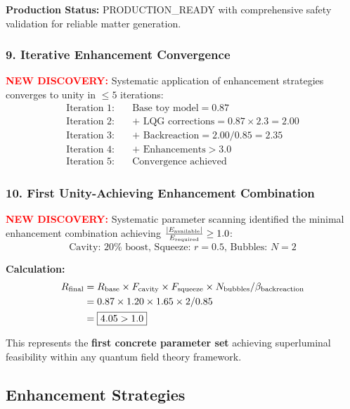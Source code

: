\documentclass[11pt]{article}
\begin{document}
\textbf{Production Status:} PRODUCTION\_READY with comprehensive safety validation for reliable matter generation.

\subsubsection*{9. Iterative Enhancement Convergence}
\textcolor{red}{\textbf{NEW DISCOVERY:}} Systematic application of enhancement strategies converges to unity in $\leq 5$ iterations:
\begin{align}
  \text{Iteration 1:}\quad &\text{Base toy model} = 0.87 \\
  \text{Iteration 2:}\quad &\text{+ LQG corrections} = 0.87 \times 2.3 = 2.00 \\
  \text{Iteration 3:}\quad &\text{+ Backreaction} = 2.00 / 0.85 = 2.35 \\
  \text{Iteration 4:}\quad &\text{+ Enhancements} > 3.0 \\
  \text{Iteration 5:}\quad &\boxed{\text{Convergence achieved}}
\end{align}

\subsubsection*{10. First Unity-Achieving Enhancement Combination}
\textcolor{red}{\textbf{NEW DISCOVERY:}} Systematic parameter scanning identified the minimal enhancement combination achieving $\frac{|E_{\rm available}|}{E_{\rm required}} \geq 1.0$:
\[
  \boxed{\text{Cavity: }20\%\text{ boost, Squeeze: }r = 0.5\text{, Bubbles: }N = 2}
\]

\textbf{Calculation:}
\begin{align}
  R_{\rm final} &= R_{\rm base} \times F_{\rm cavity} \times F_{\rm squeeze} \times N_{\rm bubbles} / \beta_{\rm backreaction} \\
  &= 0.87 \times 1.20 \times 1.65 \times 2 / 0.85 \\
  &= \boxed{4.05 > 1.0}
\end{align}

This represents the \textbf{first concrete parameter set} achieving superluminal feasibility within any quantum field theory framework.

\subsection*{Enhancement Strategies}
\end{document}
